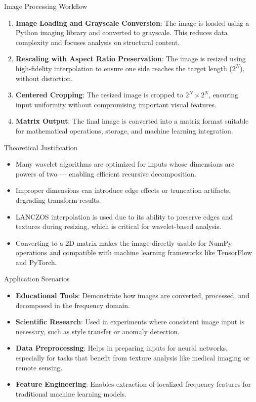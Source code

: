 \documentclass{beamer}
\begin{document}
\begin{frame}{Image Processing Workflow}
    \begin{enumerate}
        \item \textbf{Image Loading and Grayscale Conversion}: The image is loaded using a Python imaging library and converted to grayscale. This reduces data complexity and focuses analysis on structural content.
        \item \textbf{Rescaling with Aspect Ratio Preservation}: The image is resized using high-fidelity interpolation to ensure one side reaches the target length ($2^N$), without distortion.
        \item \textbf{Centered Cropping}: The resized image is cropped to $2^N \times 2^N$, ensuring input uniformity without compromising important visual features.
        \item \textbf{Matrix Output}: The final image is converted into a matrix format suitable for mathematical operations, storage, and machine learning integration.
    \end{enumerate}
\end{frame}

\begin{frame}{Theoretical Justification}
    \begin{itemize}
        \item Many wavelet algorithms are optimized for inputs whose dimensions are powers of two — enabling efficient recursive decomposition.
        \item Improper dimensions can introduce edge effects or truncation artifacts, degrading transform results.
        \item LANCZOS interpolation is used due to its ability to preserve edges and textures during resizing, which is critical for wavelet-based analysis.
        \item Converting to a 2D matrix makes the image directly usable for NumPy operations and compatible with machine learning frameworks like TensorFlow and PyTorch.
    \end{itemize}
\end{frame}

\begin{frame}{Application Scenarios}
    \begin{itemize}
        \item \textbf{Educational Tools}: Demonstrate how images are converted, processed, and decomposed in the frequency domain.
        \item \textbf{Scientific Research}: Used in experiments where consistent image input is necessary, such as style transfer or anomaly detection.
        \item \textbf{Data Preprocessing}: Helps in preparing inputs for neural networks, especially for tasks that benefit from texture analysis like medical imaging or remote sensing.
        \item \textbf{Feature Engineering}: Enables extraction of localized frequency features for traditional machine learning models.
    \end{itemize}
\end{frame}
\end{document}
